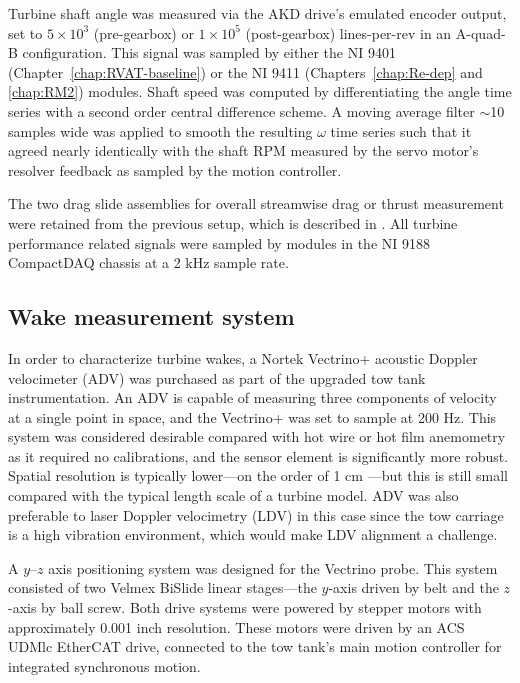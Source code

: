 Turbine shaft angle was measured via the AKD drive's emulated encoder output,
set to $5 \times 10^3$ (pre-gearbox) or $1 \times 10^5$ (post-gearbox)
lines-per-rev in an A-quad-B configuration. This signal was sampled by either
the NI 9401 (Chapter~\ref{chap:RVAT-baseline}) or the NI 9411
(Chapters~\ref{chap:Re-dep} and \ref{chap:RM2}) modules. Shaft speed was
computed by differentiating the angle time series with a second order central
difference scheme. A moving average filter $\sim$10 samples wide was applied to
smooth the resulting $\omega$ time series such that it agreed nearly identically
with the shaft RPM measured by the servo motor's resolver feedback as sampled by
the motion controller.

The two drag slide assemblies for overall streamwise drag or thrust measurement
were retained from the previous setup, which is described in
\cite{Bachant2011-MS}. All turbine performance related signals were sampled by
modules in the NI 9188 CompactDAQ chassis at a 2 kHz sample rate.


\subsection{Wake measurement system}

In order to characterize turbine wakes, a Nortek Vectrino+ acoustic Doppler
velocimeter (ADV) was purchased as part of the upgraded tow tank
instrumentation. An ADV is capable of measuring three components of velocity at
a single point in space, and the Vectrino+ was set to sample at 200 Hz. This
system was considered desirable compared with hot wire or hot film anemometry as
it required no calibrations, and the sensor element is significantly more
robust. Spatial resolution is typically lower---on the order of 1 cm
\cite{NortekVectrino}---but this is still small compared with the typical length
scale of a turbine model. ADV was also preferable to laser Doppler velocimetry
(LDV) in this case since the tow carriage is a high vibration environment, which
would make LDV alignment a challenge.

A $y$--$z$ axis positioning system was designed for the Vectrino probe. This
system consisted of two Velmex BiSlide linear stages---the $y$-axis driven by
belt and the $z$-axis by ball screw. Both drive systems were powered by stepper
motors with approximately 0.001 inch resolution. These motors were driven by an
ACS UDMlc EtherCAT drive, connected to the tow tank's main motion controller for
integrated synchronous motion.


